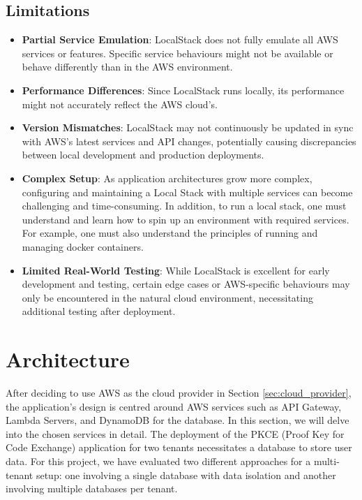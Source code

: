 \subsection{Limitations}
\begin{itemize}
    \item \textbf{Partial Service Emulation}: 
    LocalStack does not fully emulate all AWS services or features. Specific service behaviours might not be available or behave differently than in the AWS environment.
    
    \item \textbf{Performance Differences}: 
    Since LocalStack runs locally, its performance might not accurately reflect the AWS cloud's.
    
    
    \item \textbf{Version Mismatches}: 
    LocalStack may not continuously be updated in sync with AWS's latest services and API changes, potentially causing discrepancies between local development and production deployments.
    
    \item \textbf{Complex Setup}: 
    As application architectures grow more complex, configuring and maintaining a Local Stack with multiple services can become challenging and time-consuming. In addition, to run a local stack, one must understand and learn how to spin up an environment with required services. For example, one must also understand the principles of running and managing docker containers.
    
    \item \textbf{Limited Real-World Testing}: 
    While LocalStack is excellent for early development and testing, certain edge cases or AWS-specific behaviours may only be encountered in the natural cloud environment, necessitating additional testing after deployment.
    
\end{itemize}

\section{Architecture}
\label{sec:architecture}
After deciding to use AWS as the cloud provider in Section \ref{sec:cloud_provider}, the application's design is centred around AWS services such as API Gateway, Lambda Servers, and DynamoDB for the database. In this section, we will delve into the chosen services in detail. The deployment of the PKCE (Proof Key for Code Exchange) application for two tenants necessitates a database to store user data. For this project, we have evaluated two different approaches for a multi-tenant setup: one involving a single database with data isolation and another involving multiple databases per tenant. 

